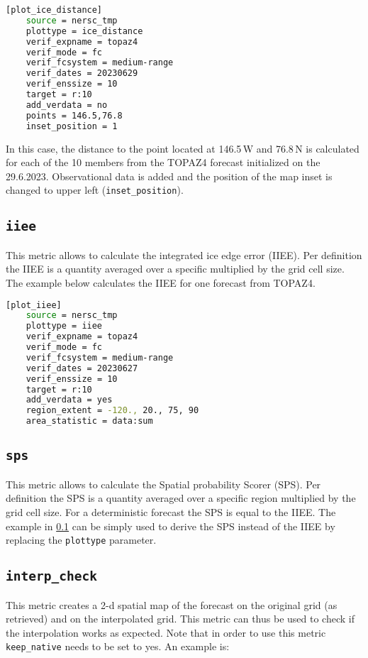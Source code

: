 \documentclass[DIV=10, parskip=full]{scrreprt}
\begin{document}
\begin{lstlisting}[language=bash]
	[plot_ice_distance]
	source = nersc_tmp
	plottype = ice_distance
	verif_expname = topaz4
	verif_mode = fc
	verif_fcsystem = medium-range
	verif_dates = 20230629
	verif_enssize = 10
	target = r:10
	add_verdata = no
	points = 146.5,76.8
	inset_position = 1
\end{lstlisting}

In this case, the distance to the point located at 146.5\,W and 76.8\,N is calculated for each of the 10 members from the TOPAZ4 forecast initialized on the 29.6.2023. Observational data is added and the position of the map inset is changed to upper left (\texttt{inset\_position}).


\subsection{\texttt{iiee}}
\label{subsec:iiee}
This metric allows to calculate the integrated ice edge error (IIEE). Per definition the IIEE is a quantity averaged over a specific multiplied by the grid cell size. The example below calculates the IIEE for one forecast from TOPAZ4.

\begin{lstlisting}[language=bash]
	[plot_iiee]
	source = nersc_tmp
	plottype = iiee
	verif_expname = topaz4
	verif_mode = fc
	verif_fcsystem = medium-range
	verif_dates = 20230627
	verif_enssize = 10
	target = r:10
	add_verdata = yes
	region_extent = -120., 20., 75, 90
	area_statistic = data:sum
\end{lstlisting}

\subsection{\texttt{sps}}
This metric allows to calculate the Spatial probability Scorer (SPS). Per definition the SPS is a quantity averaged over a specific region multiplied by the grid cell size. For a deterministic forecast the SPS is equal to the IIEE. The example in \ref{subsec:iiee} can be simply used to derive the SPS instead of the IIEE by replacing the \texttt{plottype} parameter. 

\subsection{\texttt{interp\_check}}
This metric creates a 2-d spatial map of the forecast on the original grid (as retrieved) and on the interpolated grid. This metric can thus be used to check if the interpolation works as expected. Note that in order to use this metric \texttt{keep\_native} needs to be set to yes. An example is:
\end{document}
